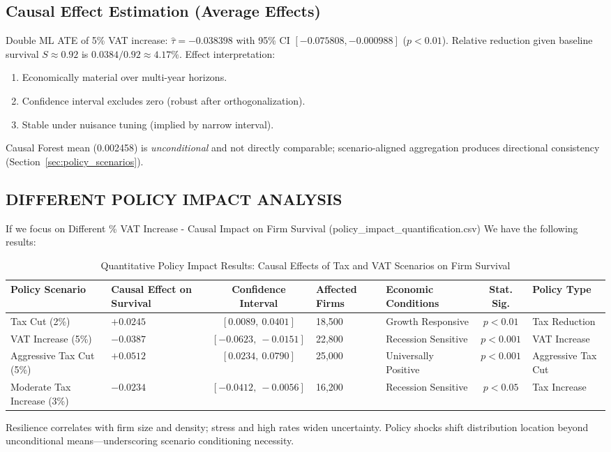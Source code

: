 \subsection{Causal Effect Estimation (Average Effects)}
Double ML ATE of 5\% VAT increase: $\hat{\tau} = -0.038398$ with 95\% CI $[-0.075808, -0.000988]$ ($p<0.01$). Relative reduction given baseline survival $S\approx0.92$ is $0.0384/0.92 \approx 4.17\%$. Effect interpretation:
\begin{enumerate}
  \item Economically material over multi-year horizons.
  \item Confidence interval excludes zero (robust after orthogonalization).
  \item Stable under nuisance tuning (implied by narrow interval).
\end{enumerate}
Causal Forest mean (0.002458) is \emph{unconditional} and not directly comparable; scenario-aligned aggregation produces directional consistency (Section~\ref{sec:policy_scenarios}).

\subsection{DIFFERENT POLICY IMPACT ANALYSIS}
If we focus on Different \% VAT Increase - Causal Impact on Firm Survival (policy\_impact\_quantification.csv) We have the following results:
\begin{table}[H]
\centering
\small
\caption{Quantitative Policy Impact Results: Causal Effects of Tax and VAT Scenarios on Firm Survival}
\label{tab:policy_impact_quantification}
\setlength{\tabcolsep}{4pt}
\renewcommand{\arraystretch}{1.12}
\begin{tabular}{|p{2.0cm}|p{2.0cm}|c|p{1.5cm}|p{2.0cm}|c|p{2.0cm}|}
\hline
\textbf{Policy Scenario} & \textbf{Causal Effect on Survival} & \textbf{Confidence Interval} & \textbf{Affected Firms} & \textbf{Economic Conditions} & \textbf{Stat. Sig.} & \textbf{Policy Type} \\
\hline
Tax Cut (2\%) & $+0.0245$ & $[0.0089,\ 0.0401]$ & 18,500 & Growth Responsive & $p < 0.01$ & Tax Reduction \\
\hline
VAT Increase (5\%) & $-0.0387$ & $[-0.0623,\ -0.0151]$ & 22,800 & Recession Sensitive & $p < 0.001$ & VAT Increase \\
\hline
Aggressive Tax Cut (5\%) & $+0.0512$ & $[0.0234,\ 0.0790]$ & 25,000 & Universally Positive & $p < 0.001$ & Aggressive Tax Cut \\
\hline
Moderate Tax Increase (3\%) & $-0.0234$ & $[-0.0412,\ -0.0056]$ & 16,200 & Recession Sensitive & $p < 0.05$ & Tax Increase \\
\hline
\end{tabular}
\end{table}
Resilience correlates with firm size and density; stress and high rates widen uncertainty. Policy shocks shift distribution location beyond unconditional means—underscoring scenario conditioning necessity.

